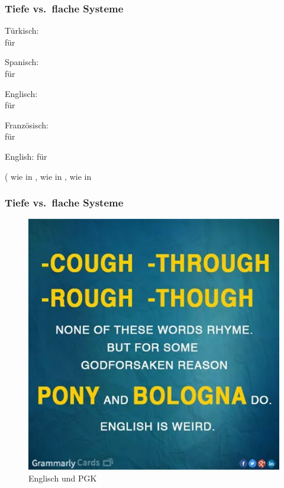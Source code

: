 \begin{frame}
\frametitle{Tiefe vs.\ flache Systeme}


	\ea Türkisch: \\
	 für \textipa{[dYkkan]}
	
	\ex Spanisch: \\
	 für \textipa{[negoTio]}
	
	\ex Englisch: \\
	 für \textipa{[bIzn@z]}
	
	\ex Französisch: \\
	 für \textipa{[butik]}
	\z 
	
\pause	
	
	\ea English:  für  

\pause  
	
	( wie in ,  wie in ,  wie in 
	\z 

\end{frame}


\begin{frame}
\frametitle{Tiefe vs.\ flache Systeme}


\begin{figure}
\centering
	\includegraphics[scale=.3]{material/04GraphEnglischPGK}
	\caption{Englisch und PGK}\label{grammarlycard}
\end{figure}

\end{frame}


